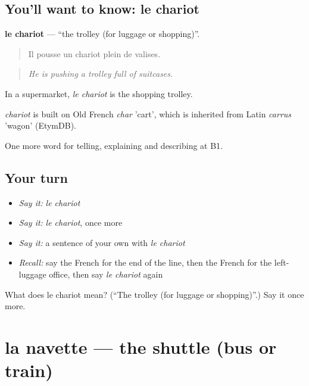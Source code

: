 \subsection*{You'll want to know: le chariot}
\textbf{le chariot} — \textquotedblleft{}the trolley (for luggage or shopping)\textquotedblright{}.

\begin{quote}
Il pousse un chariot plein de valises.
\end{quote}

\begin{quote}
\emph{He is pushing a trolley full of suitcases.}
\end{quote}

In a supermarket, \emph{le chariot} is the shopping trolley.

\begin{cousinweb}
\emph{chariot} is built on Old French \emph{char} 'cart', which is inherited from Latin \emph{carrus} 'wagon' (EtymDB).
\end{cousinweb}

\begin{grammarlens}[title={What you've built}]
One more word for telling, explaining and describing at B1.
\end{grammarlens}

\subsection*{Your turn}
\begin{itemize}
\raggedright
  \item \emph{Say it:} \emph{le chariot}
  \item \emph{Say it:} \emph{le chariot}, once more
  \item \emph{Say it:} a sentence of your own with \emph{le chariot}
  \item \emph{Recall:} say the French for the end of the line, then the French for the left-luggage office, then say \emph{le chariot} again
\end{itemize}

\begin{tcolorbox}[breakable,colback=teal!4,colframe=teal!35!black,title={Before you move on}]
What does le chariot mean? (\textquotedblleft{}The trolley (for luggage or shopping)\textquotedblright{}.) Say it once more.
\end{tcolorbox}
\section[la navette]{la navette — the shuttle (bus or train)}

